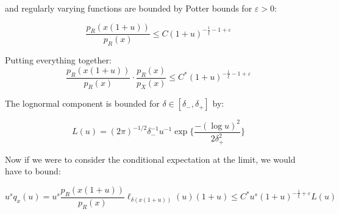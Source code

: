 \documentclass{article}
\begin{document}
and regularly varying functions are bounded by Potter bounds for $\varepsilon > 0$:

\[
  \frac{p_R(x(1+u))}{p_R(x)} \leq C (1+u)^{-\frac{1}{\xi} - 1 + \varepsilon}
\]

Putting everything together:
\[
  \frac{p_R(x(1+u))}{p_R(x)} \cdot \frac{p_R(x)}{p_X(x)} \leq C^* (1+u)^{-\frac{1}{\xi} - 1 + \varepsilon} 
\] 

The lognormal component is bounded for $\delta \in [\delta_{-}, \delta_{+}]$ by:

\[
  L(u) = (2 \pi)^{-1/2} \delta_{-}^{-1} u^{-1} \exp\{\frac{-(\log u)^2}{2 \delta_{+}^2}\}
\]

Now if we were to consider the conditional expectation at the limit, we would have to bound:

\[
  u^s q_x(u) = u^s \frac{p_R(x(1+u))}{p_R(x)} \ell_{\delta(x(1+u))}(u) (1+u) \leq C^* u^s (1+u)^{-\frac{1}{\xi} + \varepsilon} L(u)
\]
\end{document}
